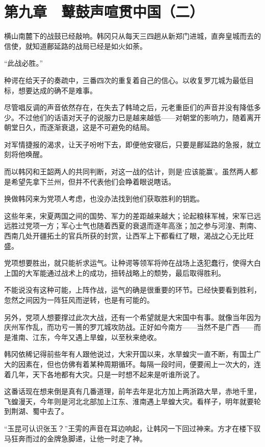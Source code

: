 \section{第九章　鼙鼓声喧贯中国（二）}

横山南麓下的战鼓已经敲响。韩冈只从每天三四趟从新郑门进城，直奔皇城而去的信使，就知道鄜延路的战局已经是如火如荼。

“此战必胜。”

种谔在给天子的奏疏中，三番四次的重复着自己的信心。以收复罗兀城为最低目标，想要达成的确不是难事。

尽管唱反调的声音依然存在，在失去了韩琦之后，元老重臣们的声音并没有降低多少。不过他们的话语对天子的说服力已是越来越低——对朝堂的影响力，随着离开朝堂日久，而逐渐衰退，这是不可避免的结局。

对军情捷报的渴求，让天子吩咐下去，即便他安寝后，只要是鄜延路的急报，就立刻将他唤醒。

而以韩冈和王韶两人的共同判断，对这一战的估计，则是‘应该能赢’。虽然两人都是希望先拿下兰州，但并不代表他们会睁着眼说瞎话。

换做韩冈来为党项人考虑，也没办法找到他们获取胜利的钥匙。

这些年来，宋夏两国之间的国势、军力的差距越来越大；论起粮秣军械，宋军已远远胜过党项一方；军心士气也随着西夏的衰退而逐年高涨；加之参与河湟、荆南、西南几处开疆拓土的官兵所获的封赏，让西军上下都看红了眼，渴战之心无比旺盛。

党项想要胜出，就只能祈求运气。让种谔等领军将帅在战场上迭犯蠢行，使得大白上国的大军能通过战术上的成功，扭转战略上的颓势，最后取得胜利。

不能说没有这种可能，上阵作战，运气的确是很重要的环节。已经快要看到胜利，忽然之间因为一阵狂风而逆转，也是有可能的。

另外，党项人想要撑过此次大战，还有一个希望就是大宋国中有事。就像当年因为庆州军作乱，而功亏一篑的罗兀城攻防战。正好如今南方——当然不是广西——而是淮南、江东，今年又遇上旱蝗，以至秋来绝收。

韩冈依稀记得前些年有人跟他说过，大宋开国以来，水旱蝗灾一直不断，有国土广大的因素在，但也仿佛有着某种周期循环。每隔一段时间，便要闹上一次大的，连着几年，天下各地都有大灾。只是一时想不起来是听谁所说了。

这番话现在想来倒是真有几番道理，前年去年是北方加上两浙路大旱，赤地千里，飞蝗漫天，今年则是河北北部加上江东、淮南遇上旱蝗大灾。看样子，明年就要轮到荆湖、蜀中去了。

“玉昆可认识张玉？”王雱的声音在耳边响起，让韩冈一下回过神来。方才在楼下驭马狂奔而过的金牌急脚递，让他一时走了神。

